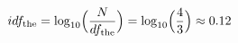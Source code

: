 \documentclass[preview]{standalone}
\begin{document}
\begin{align*}
idf_{\text{the}}=\log_{10}\Bigl(\frac{N}{df_{\text{the}}}\Bigr)=\log_{10}\Bigl(\frac{4}{3}\Bigr)\approx 0.12
\end{align*}
\end{document}
